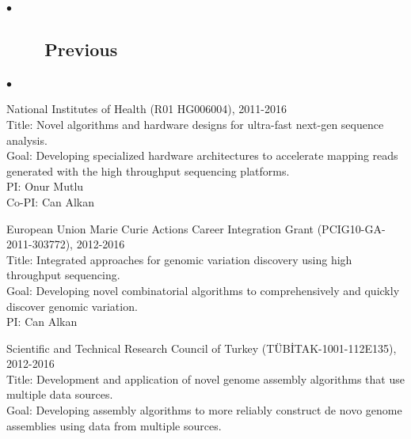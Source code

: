\documentclass[margin,line]{res}
\newenvironment{list2}{
  \begin{list}{$\bullet$}{%
      \setlength{\itemsep}{0in}
      \setlength{\parsep}{0in} \setlength{\parskip}{0in}
      \setlength{\topsep}{0in} \setlength{\partopsep}{0in} 
      \setlength{\leftmargin}{0.2in}}}{\end{list}}
\begin{document}
\begin{resume}
\begin{list2}
                                       \end{list2}
               

\vspace{-0.5cm}
                                       \subsection{\small \sc ~~~~Previous}
                                       \begin{list2}
                                       \item
                                         National Institutes of Health (R01 HG006004), 2011-2016\\
                                         Title: Novel algorithms and hardware designs for ultra-fast next-gen sequence analysis.\\
                                         Goal: Developing specialized hardware architectures to accelerate mapping reads generated with the high throughput sequencing platforms.\\
                                         PI: Onur Mutlu\\
                                         Co-PI: Can Alkan
                                       \item
                                         European Union Marie Curie Actions Career Integration Grant (PCIG10-GA-2011-303772),  2012-2016\\
                                         Title: Integrated approaches for genomic variation discovery using high throughput sequencing.\\
                                         Goal: Developing novel combinatorial algorithms to comprehensively and quickly discover genomic variation.\\
                                         PI: Can Alkan
\clearpage
                                       \item
                                         Scientific and Technical Research Council of Turkey (T\"{U}B\.{I}TAK-1001-112E135), 2012-2016\\
                                         Title: Development and application of novel genome assembly algorithms that use multiple data sources.\\
                                         Goal: Developing assembly algorithms to more reliably construct de novo genome assemblies using data from multiple sources.\\

\end{list2}
\end{resume}
\end{document}

